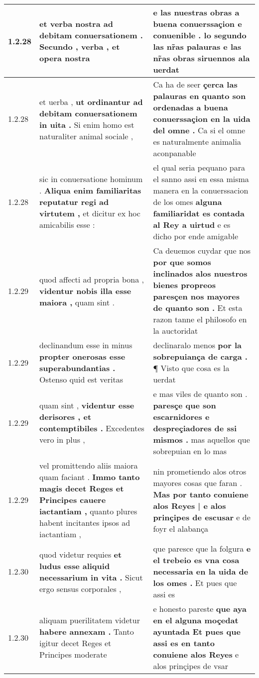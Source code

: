 \begin{tabular}{|p{1cm}|p{6.5cm}|p{6.5cm}|}
1.2.28 & et verba nostra \textbf{ ad debitam conuersationem . } Secundo , verba , et opera nostra & e las nuestras obras a buena conuerssaçion e conuenible . \textbf{ lo segundo las nr̃as palauras } e las nr̃as obras siruennos ala uerdat \\\hline
1.2.28 & et uerba , \textbf{ ut ordinantur ad debitam conuersationem in uita . } Si enim homo est naturaliter animal sociale , & Ca ha de seer \textbf{ çerca las palauras en quanto son ordenadas a buena conuerssaçion en la uida del omne . } Ca si el omne es naturalmente animalia aconpanable \\\hline
1.2.28 & sic in conuersatione hominum . \textbf{ Aliqua enim familiaritas reputatur regi ad virtutem , } et dicitur ex hoc amicabilis esse : & el qual seria pequano para el sanno assi en essa misma manera en la conuerssacion de los omes \textbf{ alguna familiaridat es contada al Rey a uirtud } e es dicho por ende amigable \\\hline
1.2.29 & quod affecti ad propria bona , \textbf{ videntur nobis illa esse maiora , } quam sint . & Ca deuemos cuydar que nos \textbf{ por que somos inclinados alos nuestros bienes propreos paresçen nos mayores de quanto son . } Et esta razon tanne el philosofo en la auctoridat \\\hline
1.2.29 & declinandum esse in minus \textbf{ propter onerosas esse superabundantias . } Ostenso quid est veritas & declinaralo menos \textbf{ por la sobrepuiança de carga . } ¶ Visto que cosa es la uerdat \\\hline
1.2.29 & quam sint , \textbf{ videntur esse derisores , et contemptibiles . } Excedentes vero in plus , & e mas viles de quanto son . \textbf{ paresçe que son escarnidores e despreçiadores de ssi mismos . } mas aquellos que sobrepuian en lo mas \\\hline
1.2.29 & vel promittendo aliis maiora quam faciant . \textbf{ Immo tanto magis decet Reges et Principes cauere iactantiam , } quanto plures habent incitantes ipsos ad iactantiam , & nin prometiendo alos otros mayores cosas que faran . \textbf{ Mas por tanto conuiene alos Reyes | e alos prinçipes de escusar } e de foyr el alabança \\\hline
1.2.30 & quod videtur requies \textbf{ et ludus esse aliquid necessarium in vita . } Sicut ergo sensus corporales , & que paresce que la folgura \textbf{ e el trebeio es vna cosa necessaria en la uida de los omes . } Et pues que assi es \\\hline
1.2.30 & aliquam puerilitatem videtur \textbf{ habere annexam . } Tanto igitur decet Reges et Principes moderate & e honesto pareste \textbf{ que aya en el alguna moçedat ayuntada Et pues que assi es en tanto conuiene alos Reyes } e alos prinçipes de vsar \\\hline

\end{tabular}
